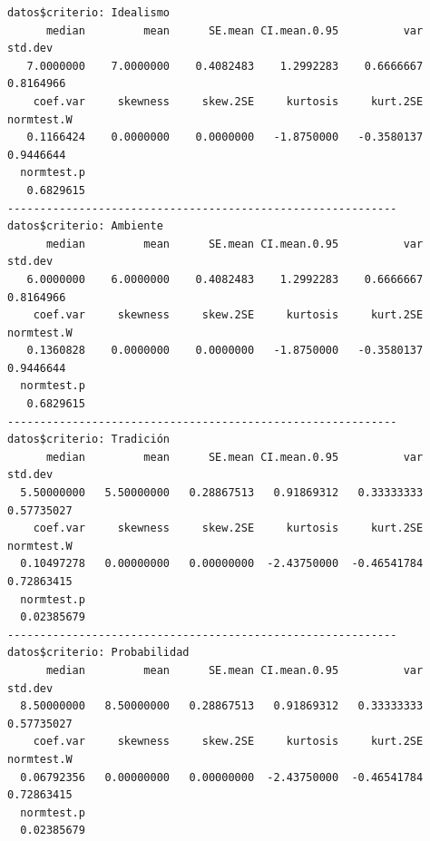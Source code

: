 \documentclass[
  ignorenonframetext,
]{beamer}
\newenvironment{Shaded}{\begin{snugshade}}{\end{snugshade}}
\newcommand{\AttributeTok}[1]{\textcolor[rgb]{0.40,0.45,0.13}{#1}}
\newcommand{\CommentTok}[1]{\textcolor[rgb]{0.37,0.37,0.37}{#1}}
\newcommand{\ConstantTok}[1]{\textcolor[rgb]{0.56,0.35,0.01}{#1}}
\newcommand{\FunctionTok}[1]{\textcolor[rgb]{0.28,0.35,0.67}{#1}}
\newcommand{\NormalTok}[1]{\textcolor[rgb]{0.00,0.23,0.31}{#1}}
\newcommand{\SpecialCharTok}[1]{\textcolor[rgb]{0.37,0.37,0.37}{#1}}
\newcommand{\StringTok}[1]{\textcolor[rgb]{0.13,0.47,0.30}{#1}}
\begin{document}
\begin{frame}[fragile]
\begin{Shaded}
\end{Shaded}

\begin{verbatim}
datos$criterio: Idealismo
      median         mean      SE.mean CI.mean.0.95          var      std.dev 
   7.0000000    7.0000000    0.4082483    1.2992283    0.6666667    0.8164966 
    coef.var     skewness     skew.2SE     kurtosis     kurt.2SE   normtest.W 
   0.1166424    0.0000000    0.0000000   -1.8750000   -0.3580137    0.9446644 
  normtest.p 
   0.6829615 
------------------------------------------------------------ 
datos$criterio: Ambiente
      median         mean      SE.mean CI.mean.0.95          var      std.dev 
   6.0000000    6.0000000    0.4082483    1.2992283    0.6666667    0.8164966 
    coef.var     skewness     skew.2SE     kurtosis     kurt.2SE   normtest.W 
   0.1360828    0.0000000    0.0000000   -1.8750000   -0.3580137    0.9446644 
  normtest.p 
   0.6829615 
------------------------------------------------------------ 
datos$criterio: Tradición
      median         mean      SE.mean CI.mean.0.95          var      std.dev 
  5.50000000   5.50000000   0.28867513   0.91869312   0.33333333   0.57735027 
    coef.var     skewness     skew.2SE     kurtosis     kurt.2SE   normtest.W 
  0.10497278   0.00000000   0.00000000  -2.43750000  -0.46541784   0.72863415 
  normtest.p 
  0.02385679 
------------------------------------------------------------ 
datos$criterio: Probabilidad
      median         mean      SE.mean CI.mean.0.95          var      std.dev 
  8.50000000   8.50000000   0.28867513   0.91869312   0.33333333   0.57735027 
    coef.var     skewness     skew.2SE     kurtosis     kurt.2SE   normtest.W 
  0.06792356   0.00000000   0.00000000  -2.43750000  -0.46541784   0.72863415 
  normtest.p 
  0.02385679 
\end{verbatim}
\end{frame}
\end{document}
